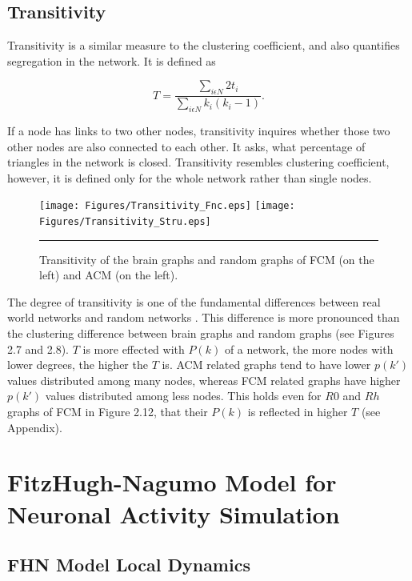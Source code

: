\subsection{Transitivity}

Transitivity is a similar measure to the clustering coefficient, and also quantifies segregation in the network. It is defined as \citep{NEW03}
	
\begin{equation}
 T = \frac{\sum\limits_{i \epsilon N} 2 t_i}{\sum\limits_{i \epsilon N}k_i (k_i - 1)} .
\end{equation}	

If a node has links to two other nodes, transitivity inquires whether those two other nodes are also connected to each other. It asks, what percentage of triangles in the network is closed. Transitivity resembles clustering coefficient, however, it is defined only for the whole network rather than single nodes. 

\begin{figure}[htbp]
  \centering
	\texttt{[image: Figures/Transitivity\_Fnc.eps]}
	\texttt{[image: Figures/Transitivity\_Stru.eps]} 
    \rule{35em}{0.5pt}
    \caption[Transitivity]{Transitivity of the brain graphs and random graphs of FCM (on the left) and ACM (on the left). }
  \label{fig:Transitivity}
\end{figure}


The degree of transitivity is one of the fundamental differences between real world networks and random networks \citep{NEW10}. This difference is more pronounced than the clustering difference between brain graphs and random graphs (see Figures 2.7 and 2.8). $T$ is more effected with $P(k)$ of a network, the more nodes with lower degrees, the higher the $T$ is. ACM related graphs tend to have lower $p(k')$ values distributed among many nodes, whereas FCM related graphs have higher $p(k')$ values distributed among less nodes. This holds even for $R0$ and $Rh$ graphs of FCM in Figure 2.12, that their $P(k)$ is reflected in higher $T$ (see Appendix).



\section{FitzHugh-Nagumo Model for Neuronal Activity Simulation}

\subsection{FHN Model Local Dynamics}

